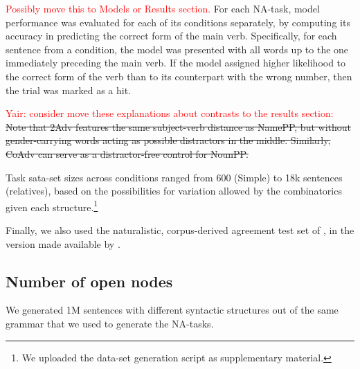 \textcolor{red}{Possibly move this to Models or Results section.} For
each NA-task, model performance was evaluated for each of its
conditions separately, by computing its accuracy in predicting the
correct form of the main verb. Specifically, for each sentence from a
condition, the model was presented with all words up to the one
immediately preceding the main verb. If the model assigned higher
likelihood to the correct form of the verb than to its counterpart
with the wrong number, then the trial was marked as a hit.

\textcolor{red}{Yair: consider move these explanations about contrasts to the results section:} \sout{Note that 2Adv features the same subject-verb
distance as NamePP, but without gender-carrying words acting as
possible distractors in the middle. Similarly, CoAdv can serve as a
distractor-free control for NounPP.}

Task sata-set sizes across conditions ranged from 600 (Simple) to 18k sentences (relatives),
based on the possibilities for variation allowed by the combinatorics
given each structure.\footnote{We uploaded the data-set generation
  script as supplementary material.}

Finally, we also used the naturalistic, corpus-derived agreement test set of , in the version made available by .

\subsection{Number of open nodes}\label{ssec:n_opennodes}

We generated 1M sentences with different syntactic structures out of the same
grammar that we used to generate the NA-tasks.




